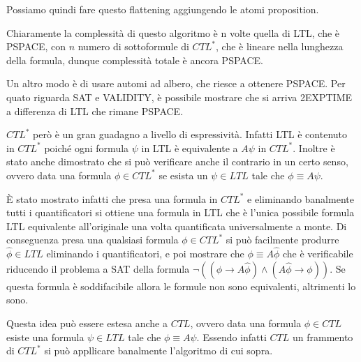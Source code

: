   Possiamo quindi fare questo flattening aggiungendo le atomi proposition.

\begin{center}
\end{center}

Chiaramente la complessità di questo algoritmo è n volte quella di LTL, che è PSPACE\@, con \(n\) numero di sottoformule di \(CTL^*\), che è lineare nella lunghezza della formula, dunque complessità totale è ancora PSPACE\@.

Un altro modo è di usare automi ad albero, che riesce a ottenere PSPACE\@. Per quato riguarda SAT e VALIDITY, è possibile mostrare che si arriva 2EXPTIME a differenza di LTL che rimane PSPACE\@.

\(CTL^*\) però è un gran guadagno a livello di espressività. Infatti LTL è contenuto in \(CTL^*\) poiché ogni formula \(\psi\) in LTL è equivalente a \(A \psi\) in \(CTL^*\). Inoltre è stato anche dimostrato che si può verificare anche il contrario in un certo senso, ovvero data una formula \(\phi \in CTL^*\) se esista un \(\psi \in LTL\) tale che \(\phi \equiv A\psi\).

È stato mostrato infatti che presa una formula in \(CTL^*\) e eliminando banalmente tutti i quantificatori si ottiene una formula in LTL che è l'unica possibile formula LTL equivalente all'originale una volta quantificata universalmente a monte. Di conseguenza presa una qualsiasi formula \(\phi \in CTL^*\) si può facilmente produrre \(\hat{\phi} \in LTL\) eliminando i quantificatori, e poi mostrare che \(\phi \equiv A \hat{\phi}\) che è verificabile riducendo il problema a SAT della formula \(\neg ((\phi \to A \hat{\phi}) \land (A\hat{\phi} \to \phi)) \). Se questa formula è soddifacibile allora le formule non sono equivalenti, altrimenti lo sono. 

Questa idea può essere estesa anche a \(CTL\), ovvero data una formula \(\phi \in CTL\) esiste una formula \(\psi \in LTL\) tale che \(\phi \equiv A\psi\). Essendo infatti \(CTL\) un frammento di \(CTL^*\) si può appllicare banalmente l'algoritmo di cui sopra.

